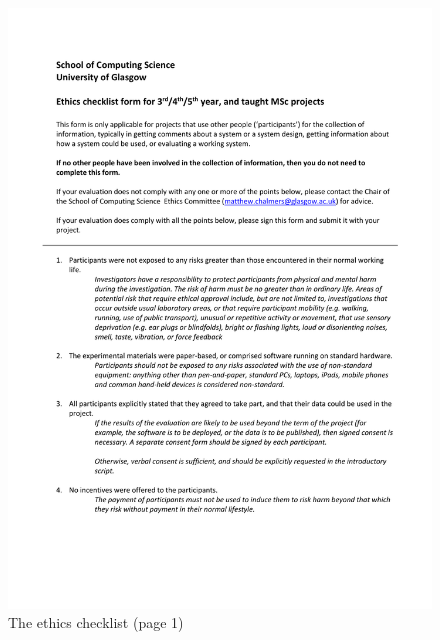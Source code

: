 \documentclass{l4proj}
\begin{document}
\begin{appendices}
\begin{figure}
    \centering
    \includegraphics[width=1\linewidth]{dissertation//images/ethicsChecklist1.pdf}
    \caption{The ethics checklist (page 1)}
\end{figure}


\end{appendices}
\end{document}
